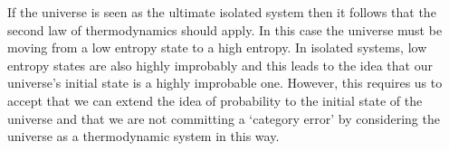\documentclass[revision-guide.tex]{subfiles}
\begin{document}

If the universe is seen as the ultimate isolated system then it follows that the second law of thermodynamics should apply. In this case the universe must be moving from a low entropy state to a high entropy. In isolated systems, low entropy states are also highly improbably and this leads to the idea that our universe's initial state is a highly improbable one. However, this requires us to accept that we can extend the idea of probability to the initial state of the universe and that we are not committing a `category error' by considering the universe as a thermodynamic system in this way.
\end{document}
